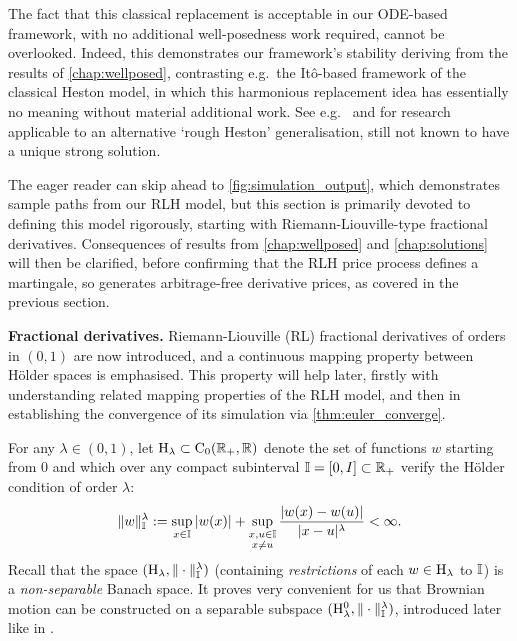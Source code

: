 The fact that this classical replacement is acceptable in our ODE-based framework, with no additional well-posedness work required, cannot be overlooked. Indeed, this demonstrates our framework's stability deriving from the results of \autoref{chap:wellposed}, contrasting e.g.~the It\^o-based framework of the classical Heston model, in which this harmonious replacement idea has essentially no meaning without material additional work. See e.g.~\cite{keller-ressel_2018} and \cite{abijaber_2019c} for research applicable to an alternative `rough Heston' generalisation, still not known to have a unique strong solution.

The eager reader can skip ahead to \autoref{fig:simulation_output}, which demonstrates sample paths from our RLH model, but this section is primarily devoted to defining this model rigorously, starting with Riemann-Liouville-type fractional derivatives. Consequences of results from \autoref{chap:wellposed} and \autoref{chap:solutions} will then be clarified, before confirming that the RLH price process defines a martingale, so generates arbitrage-free derivative prices, as covered in the previous section.

\vspace{3mm}\textbf{Fractional derivatives.} Riemann-Liouville (RL) fractional derivatives of orders in $(0,1)$ are now introduced, and a continuous mapping property between H\"older spaces is emphasised. This property will help later, firstly with understanding related mapping properties of the RLH model, and then in establishing the convergence of its simulation via \autoref{thm:euler_converge}.

For any $\lambda\in(0,1)$, let $\mathrm{H}_\lambda\subset\mathrm{C}_0(\mathbb{R}_+,\mathbb{R})$ denote the set of functions $w$ starting from 0 and which over any compact subinterval $\mathbb{I}=[0,I]\subset\mathbb{R}_+$ verify the H\"older condition of order $\lambda$:
\begin{equation}
    \Vert w \Vert^\lambda_{\mathbb{I}} := \sup_{x\in\mathbb{I}}|w(x)| + \sup_{\substack{x,u\in\mathbb{I} \\ x\neq u}}\frac{|w(x) - w(u)|}{|x - u|^\lambda}<\infty.
\end{equation}
Recall that the space $(\mathrm{H}_\lambda,\Vert\cdot\Vert^\lambda_{\mathbb{I}})$ (containing \emph{restrictions} of each $w\in\mathrm{H}_\lambda$ to $\mathbb{I}$) is a \emph{non-separable} Banach space. It proves very convenient for us that Brownian motion can be constructed on a separable subspace $(\mathrm{H}^0_\lambda,\Vert\cdot\Vert^\lambda_{\mathbb{I}})$, introduced later like in \cite{hamadouche_2000}.

